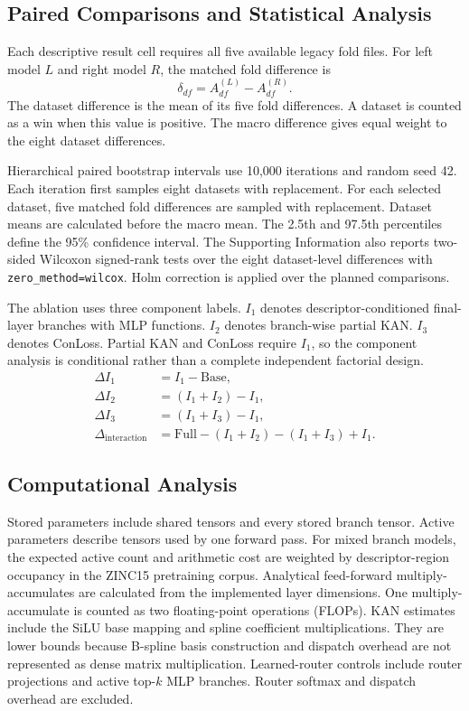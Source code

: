 \documentclass[journal=jcisd8,manuscript=article]{achemso}
\begin{document}
\subsection{Paired Comparisons and Statistical Analysis}

Each descriptive result cell requires all five available legacy fold files.
For left model \(L\) and right model \(R\), the matched fold difference is
\begin{equation}
\delta_{df}
=
A_{df}^{(L)}
-
A_{df}^{(R)}.
\end{equation}
The dataset difference is the mean of its five fold differences. A dataset is counted as a win when this value is positive. The macro difference gives equal weight to the eight dataset differences.

Hierarchical paired bootstrap intervals use 10,000 iterations and random seed 42. Each iteration first samples eight datasets with replacement. For each selected dataset, five matched fold differences are sampled with replacement. Dataset means are calculated before the macro mean. The 2.5th and 97.5th percentiles define the 95\% confidence interval. The Supporting Information also reports two-sided Wilcoxon signed-rank tests over the eight dataset-level differences with \texttt{zero\_method=wilcox}. Holm correction is applied over the planned comparisons.

The ablation uses three component labels. \(I_1\) denotes descriptor-conditioned final-layer branches with MLP functions. \(I_2\) denotes branch-wise partial KAN. \(I_3\) denotes ConLoss. Partial KAN and ConLoss require \(I_1\), so the component analysis is conditional rather than a complete independent factorial design.
\begin{align}
\Delta I_1 &= I_1-\mathrm{Base},\\
\Delta I_2 &= (I_1+I_2)-I_1,\\
\Delta I_3 &= (I_1+I_3)-I_1,\\
\Delta_{\mathrm{interaction}}
&=
\mathrm{Full}-(I_1+I_2)-(I_1+I_3)+I_1.
\end{align}

\subsection{Computational Analysis}

Stored parameters include shared tensors and every stored branch tensor. Active parameters describe tensors used by one forward pass. For mixed branch models, the expected active count and arithmetic cost are weighted by descriptor-region occupancy in the ZINC15 pretraining corpus. Analytical feed-forward multiply-accumulates are calculated from the implemented layer dimensions. One multiply-accumulate is counted as two floating-point operations (FLOPs). KAN estimates include the SiLU base mapping and spline coefficient multiplications. They are lower bounds because B-spline basis construction and dispatch overhead are not represented as dense matrix multiplication. Learned-router controls include router projections and active top-\(k\) MLP branches. Router softmax and dispatch overhead are excluded.
\end{document}
